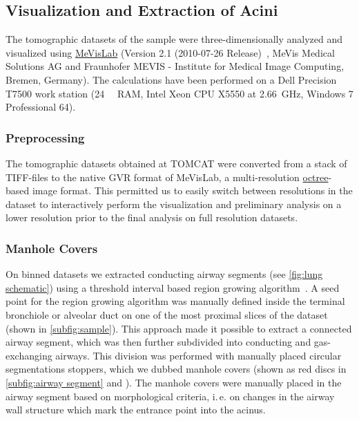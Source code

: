 \documentclass[%
	paper=a4,%
	abstract=true,%
	]{scrartcl}
\newcommand{\ie}{i.\,e.\xspace}
\begin{document}
\subsection{Visualization and Extraction of Acini}
The tomographic datasets of the sample were three-dimensionally analyzed and visualized using \href{http://mevislab.de}{MeVisLab} (Version 2.1 (2010-07-26 Release)~\cite{Bitter2007}, MeVis Medical Solutions AG and Fraunhofer MEVIS - Institute for Medical Image Computing, Bremen, Germany). The calculations have been performed on a Dell Precision T7500 work station (\SI{24}{\giga\byte} RAM, Intel Xeon CPU X5550 at \SI{2.66}{\giga\hertz}, Windows 7 Professional \SI{64}{\bit}).

\subsubsection{Preprocessing}
The tomographic datasets obtained at TOMCAT were converted from a stack of TIFF-files to the native GVR format of MeVisLab, a multi-resolution \href{https://secure.wikimedia.org/wikipedia/en/w/index.php?title=Octree&oldid=409131920}{octree}-based image format. This permitted us to easily switch between resolutions in the dataset to interactively perform the visualization and preliminary analysis on a lower resolution prior to the final analysis on full resolution datasets.

\subsubsection{Manhole Covers\label{sec:manholecovers}}
On binned datasets we extracted conducting airway segments (see \autoref{fig:lung schematic}) using a threshold interval based region growing algorithm~\cite{Zucker1976}. A seed point for the region growing algorithm was manually defined inside the terminal bronchiole or alveolar duct on one of the most proximal slices of the dataset (shown in \autoref{subfig:sample}). This approach made it possible to extract a connected airway segment, which was then further subdivided into conducting and gas-exchanging airways. This division was performed with manually placed circular segmentations stoppers, which we dubbed manhole covers (shown as red discs in \autoref{subfig:airway segment} and ). The manhole covers were manually placed in the airway segment based on morphological criteria, \ie on changes in the airway wall structure which mark the entrance point into the acinus.
\end{document}

